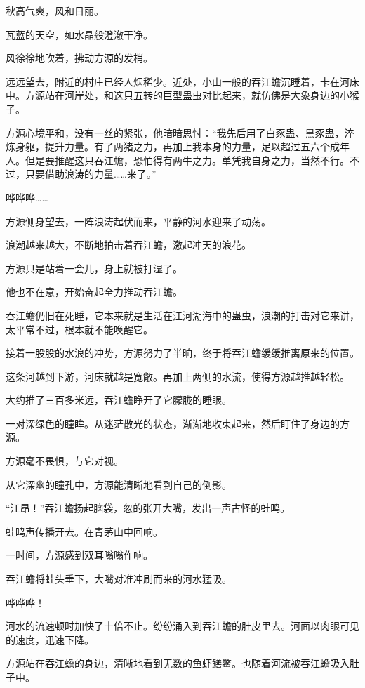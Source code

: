 
\begin{this_body}

秋高气爽，风和日丽。

瓦蓝的天空，如水晶般澄澈干净。

风徐徐地吹着，拂动方源的发梢。

远远望去，附近的村庄已经人烟稀少。近处，小山一般的吞江蟾沉睡着，卡在河床中。方源站在河岸处，和这只五转的巨型蛊虫对比起来，就仿佛是大象身边的小猴子。

方源心境平和，没有一丝的紧张，他暗暗思忖：“我先后用了白豕蛊、黒豕蛊，淬炼身躯，提升力量。有了两猪之力，再加上我本身的力量，足以超过五六个成年人。但是要推醒这只吞江蟾，恐怕得有两牛之力。单凭我自身之力，当然不行。不过，只要借助浪涛的力量……来了。”

哗哗哗……

方源侧身望去，一阵浪涛起伏而来，平静的河水迎来了动荡。

浪潮越来越大，不断地拍击着吞江蟾，激起冲天的浪花。

方源只是站着一会儿，身上就被打湿了。

他也不在意，开始奋起全力推动吞江蟾。

吞江蟾仍旧在死睡，它本来就是生活在江河湖海中的蛊虫，浪潮的打击对它来讲，太平常不过，根本就不能唤醒它。

接着一股股的水浪的冲势，方源努力了半晌，终于将吞江蟾缓缓推离原来的位置。

这条河越到下游，河床就越是宽敞。再加上两侧的水流，使得方源越推越轻松。

大约推了三百多米远，吞江蟾睁开了它朦胧的睡眼。

一对深绿色的瞳眸。从迷茫散光的状态，渐渐地收束起来，然后盯住了身边的方源。

方源毫不畏惧，与它对视。

从它深幽的瞳孔中，方源能清晰地看到自己的倒影。

“江昂！”吞江蟾扬起脑袋，忽的张开大嘴，发出一声古怪的蛙鸣。

蛙鸣声传播开去。在青茅山中回响。

一时间，方源感到双耳嗡嗡作响。

吞江蟾将蛙头垂下，大嘴对准冲刷而来的河水猛吸。

哗哗哗！

河水的流速顿时加快了十倍不止。纷纷涌入到吞江蟾的肚皮里去。河面以肉眼可见的速度，迅速下降。

方源站在吞江蟾的身边，清晰地看到无数的鱼虾鳝鳖。也随着河流被吞江蟾吸入肚子中。


\end{this_body}
